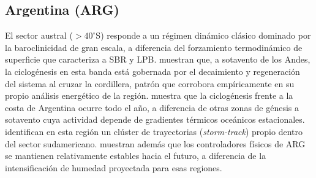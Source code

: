 \subsection{Argentina (ARG)}\label{subsec:tb_arg}


El sector austral ($>40^\circ$S) responde a un régimen dinámico clásico dominado por la baroclinicidad de gran escala, a diferencia del forzamiento termodinámico de superficie que caracteriza a SBR y LPB.
\citet{hoskins2005new} muestran que, a sotavento de los Andes, la ciclogénesis en esta banda está gobernada por el decaimiento y regeneración del sistema al cruzar la cordillera, patrón que \citet{coutodesouza2024thesis} corrobora empíricamente en su propio análisis energético de la región.
\citet{sinclair1995climatology} muestra que la ciclogénesis frente a la costa de Argentina ocurre todo el año, a diferencia de otras zonas de génesis a sotavento cuya actividad depende de gradientes térmicos oceánicos estacionales.
\citet{mendes2010climatology} identifican en esta región un clúster de trayectorias (\textit{storm-track}) propio dentro del sector sudamericano.
\citet{gramcianinov2024early} muestran además que los controladores físicos de ARG se mantienen relativamente estables hacia el futuro, a diferencia de la intensificación de humedad proyectada para esas regiones.

